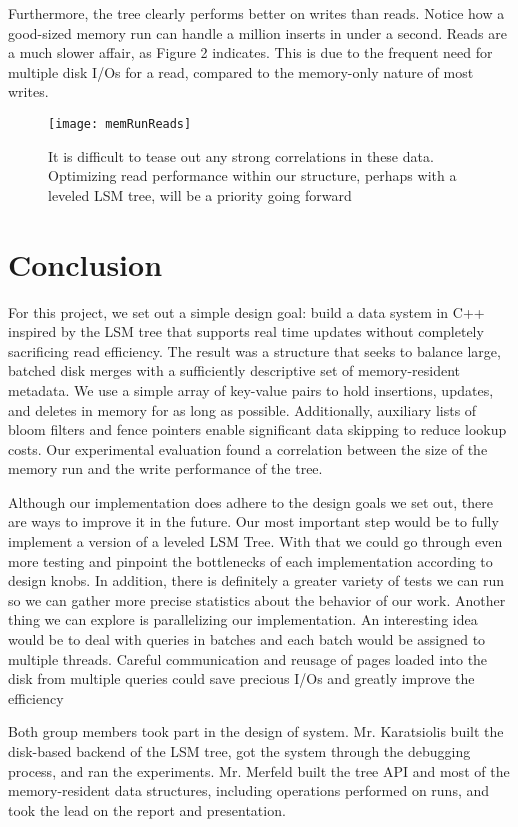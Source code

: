\documentclass[12pt]{article}
\begin{document}
Furthermore, the tree clearly performs better on writes than reads. Notice how a good-sized memory run can handle a million inserts in under a second. Reads are a much slower affair, as Figure 2 indicates. This is due to the frequent need for multiple disk I/Os for a read, compared to the memory-only nature of most writes.
  \begin{figure}[h!]
 \centering
  \texttt{[image: memRunReads]}
 \caption{It is difficult to tease out any strong correlations in these data. Optimizing read performance within our structure, perhaps with a leveled LSM tree, will be a priority going forward}
 \end{figure}

\section{Conclusion}
\indent \indent For this project, we set out a simple design goal: build a data system in C++ inspired by the LSM tree that supports real time updates without completely sacrificing read efficiency. The result was a structure that seeks to balance large, batched disk merges with a sufficiently descriptive set of memory-resident metadata. We use a simple array of key-value pairs to hold insertions, updates, and deletes in memory for as long as possible. Additionally, auxiliary lists of bloom filters and fence pointers enable significant data skipping to reduce lookup costs. Our experimental evaluation found a correlation between the size of the memory run and the write performance of the tree.
	
	Although our implementation does adhere to the design goals we set out, there are ways to improve it in the future. Our most important step would be to fully implement a version of a leveled LSM Tree. With that we could go through even more testing and pinpoint the bottlenecks of each implementation according to design knobs. In addition, there is definitely a greater variety of tests we can run so we can gather more precise statistics about the behavior of our work. Another thing we can explore is parallelizing our implementation. An interesting idea would be to deal with queries in batches and each batch would be assigned to multiple threads. Careful communication and reusage of pages loaded into the disk from multiple queries could save precious I/Os and greatly improve the efficiency
	
	Both group members took part in the design of system. Mr. Karatsiolis built the disk-based backend of the LSM tree, got the system through the debugging process, and ran the experiments. Mr. Merfeld built the tree API and most of the memory-resident data structures, including operations performed on runs, and took the lead on the report and presentation.
\end{document}
